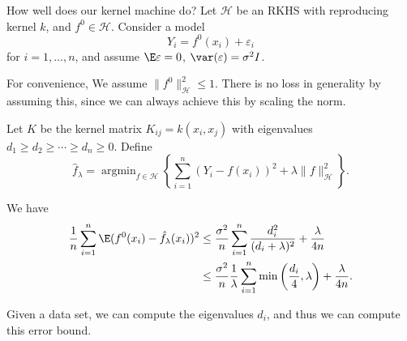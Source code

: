 \documentclass[a4paper]{article}
\DeclareMathOperator*\argmin{argmin}
\begin{document}
How well does our kernel machine do? Let $\mathcal{H}$ be an RKHS with reproducing kernel $k$, and $f^0 \in \mathcal{H}$. Consider a model
\[
  Y_i = f^0(x_i) + \varepsilon_i
\]
for $i = 1, \ldots, n$, and assume $\E \varepsilon = 0$, $\var(\varepsilon) = \sigma^2 I$.

For convenience, We assume $\|f^0\|^2_{\mathcal{H}} \leq 1$. There is no loss in generality by assuming this, since we can always achieve this by scaling the norm.

Let $K$ be the kernel matrix $K_{ij} = k(x_i, x_j)$ with eigenvalues $d_1 \geq d_2 \geq \cdots \geq d_n \geq 0$. Define
\[
  \hat{f}_\lambda = \argmin_{f \in \mathcal{H}} \left\{ \sum_{i = 1}^n (Y_i - f(x_i))^2 + \lambda \|f\|_\mathcal{H}^2\right\}.
\]
\begin{thm}
  We have
  \begin{align*}
    \frac{1}{n} \sum_{i = 1}^n \E(f^0(x_i) - \hat{f}_\lambda (x_i))^2 &\leq \frac{\sigma^2}{n} \sum_{i = 1}^n \frac{d_i^2}{(d_i + \lambda)^2} + \frac{\lambda}{4n}\\
    &\leq \frac{\sigma^2}{n} \frac{1}{\lambda} \sum_{i = 1}^n \min \left(\frac{d_i}{4}, \lambda\right) + \frac{\lambda}{4n}.
  \end{align*}
\end{thm}
Given a data set, we can compute the eigenvalues $d_i$, and thus we can compute this error bound.
\end{document}
